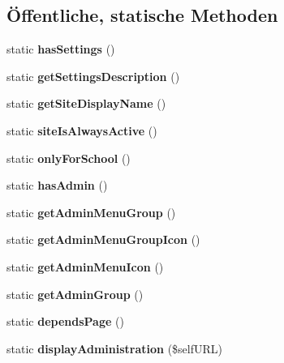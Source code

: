 \subsection*{Öffentliche, statische Methoden}
\begin{DoxyCompactItemize}
\item 
\mbox{\label{classklassentagebuchauswertung_aa45ba486434dfd9ca7f4fd2e833f39c0}} 
static {\bfseries has\+Settings} ()
\item 
\mbox{\label{classklassentagebuchauswertung_af8525586c5ec82fb77e1ecd340f77f0b}} 
static {\bfseries get\+Settings\+Description} ()
\item 
\mbox{\label{classklassentagebuchauswertung_ac7759cdfbf0c2ce7c69671b5dac5fed6}} 
static {\bfseries get\+Site\+Display\+Name} ()
\item 
\mbox{\label{classklassentagebuchauswertung_ae38d88c15f0c0bcdba79cb4d04ccab71}} 
static {\bfseries site\+Is\+Always\+Active} ()
\item 
\mbox{\label{classklassentagebuchauswertung_a90f5af486686f7b4cf8bf5a0f3036b1f}} 
static {\bfseries only\+For\+School} ()
\item 
\mbox{\label{classklassentagebuchauswertung_adf6481777ff4e4e66d8834b5f62cd0ea}} 
static {\bfseries has\+Admin} ()
\item 
\mbox{\label{classklassentagebuchauswertung_ad9e5ceef986c3f84ab6f26c55a7d4f5a}} 
static {\bfseries get\+Admin\+Menu\+Group} ()
\item 
\mbox{\label{classklassentagebuchauswertung_ae94df82224ec3d4dd49e5299dabf637b}} 
static {\bfseries get\+Admin\+Menu\+Group\+Icon} ()
\item 
\mbox{\label{classklassentagebuchauswertung_afed8c2e223f77c956c6757f7877da813}} 
static {\bfseries get\+Admin\+Menu\+Icon} ()
\item 
\mbox{\label{classklassentagebuchauswertung_a44ff61e014b9d81c16d9e9bc53031f8f}} 
static {\bfseries get\+Admin\+Group} ()
\item 
\mbox{\label{classklassentagebuchauswertung_a913baade69abec179f155f05ffd49356}} 
static {\bfseries depends\+Page} ()
\item 
\mbox{\label{classklassentagebuchauswertung_a132f71bcd5737c2aedbc3bcc12d7f844}} 
static {\bfseries display\+Administration} (\$self\+U\+RL)
\end{DoxyCompactItemize}
